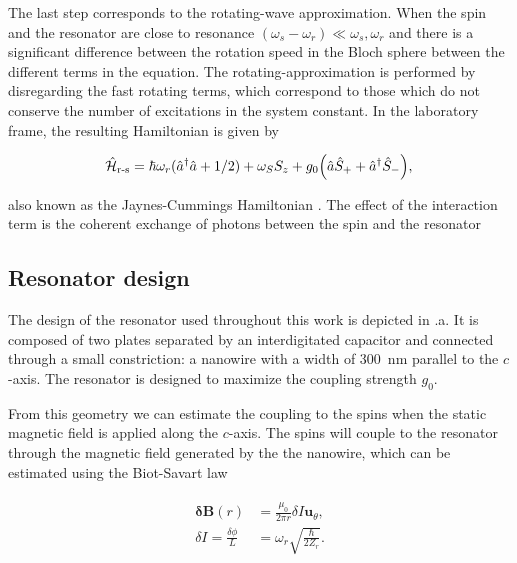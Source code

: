 The last step corresponds to the rotating-wave approximation. When the spin and the resonator are close to resonance $(\omega_{s}-\omega_{r}) \ll \omega_{s}, \omega_r$ and there is a significant difference between the rotation speed in the Bloch sphere between the different terms in the equation. The rotating-approximation is performed by disregarding the fast rotating terms, which correspond to those which do not conserve the number of excitations in the system constant.  In the laboratory frame, the resulting Hamiltonian is given by

\begin{equation}
    \hat{\mathcal{H}}_{\text{r-s}} = \hbar\omega_r(\hat{a}^\dagger \hat{a} + 1/2) +  \omega_S S_z + g_{0} \Big( \hat{a}\hat{S}_{+} + \hat{a}^{\dagger}\hat{S}_{-} \Big), \\
\end{equation}

\noindent also known as the Jaynes-Cummings Hamiltonian . The effect of the interaction term is the coherent exchange of photons between the spin and the resonator

\subsection{Resonator design}

The design of the resonator used throughout this work is depicted in .a. It is composed of two plates separated by an interdigitated capacitor and connected through a small constriction: a nanowire with a width of 300~nm parallel to the $c$-axis. The resonator is designed to maximize the coupling strength $g_0$.

From this geometry we can estimate the coupling to the spins when the static magnetic field is applied along the $c$-axis. The spins will couple to the resonator through the magnetic field generated by the the nanowire, which can be estimated  using the Biot-Savart law

\begin{align}
\begin{split}
    \boldsymbol{\delta}\mathbf{B}(r) &= \frac{\mu_0}{2 \pi r} \delta I \mathbf{u}_\theta, \\
    \delta I = \frac{\delta \phi}{L} &= \omega_r \sqrt{\frac{\hbar}{2Z_r}}.
\end{split}
\end{align}

